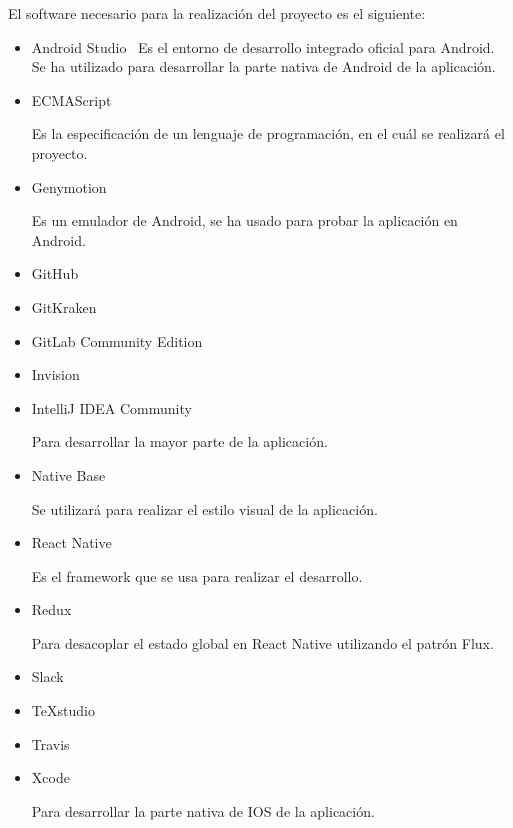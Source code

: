  El software necesario para la realización del proyecto es el siguiente:
\begin{itemize}
	\item Android Studio~\cite{ASTUDIO}
	Es el entorno de desarrollo integrado oficial para Android. Se ha utilizado para desarrollar la parte nativa 
	de Android de la aplicación.
	
	\item ECMAScript~\cite{ECMA}~\cite{ECMABOOK}
	
	Es la especificación de un lenguaje de programación, en el cuál se realizará el proyecto.
	
	\item Genymotion
	
	Es un emulador de Android, se ha usado para probar la aplicación en Android.
	
	\item GitHub
	
	
	\item GitKraken
	
	
	\item GitLab Community Edition
	
	
	\item Invision
	
	
	\item IntelliJ IDEA Community~\cite{IDEA}
	
	Para desarrollar la mayor parte de la aplicación.
	
	\item Native Base~\cite{NABA}
	
	Se utilizará para realizar el estilo visual de la aplicación.
	
	\item React Native~\cite{RENA}~\cite{REACTBOOK}
	
	Es el framework que se usa para realizar el desarrollo.
	
	\item Redux~\cite{REDUX}
	
	Para desacoplar el estado global en React Native utilizando el patrón Flux.
	
	\item Slack
	
	
	\item TeXstudio
	
	
	\item Travis
	
	
	\item Xcode~\cite{XCODE}
	
	Para desarrollar la parte nativa de IOS de la aplicación.
\end{itemize}

